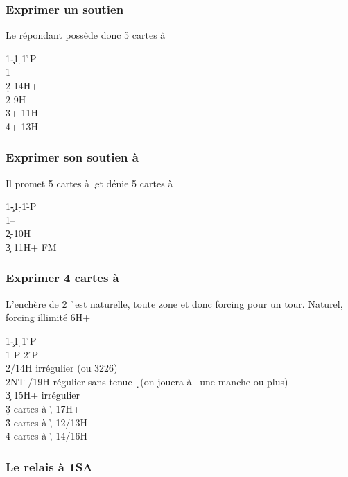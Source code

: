 \documentclass[a4paper]{article}
\begin{document}
\subsubsection{Exprimer un soutien \pdfs}

Le répondant possède donc 5 cartes à \s 

\begin{bidtable}
1\c-1\d-1\h-P\\
1\s--\\
2\d \> 14H+\\
2\s {}-9H\\
3\s {}+-11H\\
4\s {}+-13H
\end{bidtable}

\subsubsection{Exprimer son soutien à \pdfc}

Il promet 5 cartes à \c\ et dénie 5 cartes à \s 

\begin{bidtable}
1\c-1\d-1\h-P\\
1\s--\\
2\c {}-10H\\
3\c \> 11H+ FM
\end{bidtable}

\subsubsection{Exprimer 4 cartes à \pdfh}

L’enchère de 2 \h\ est naturelle, toute zone et donc forcing pour un tour.
Naturel, forcing illimité 6H+

\begin{bidtable}
1\c-1\d-1\h-P\\
1\s-P-2\h-P--\\
2\s {}/14H irrégulier (ou 3226)\\
2NT /19H régulier sans tenue \d\ (on jouera à \s\ une manche ou plus)\\
3\c \> 15H+ irrégulier\\
3\d {} cartes à \h , 17H+\\
3\h {} cartes à \h , 12/13H\\
4\h {} cartes à \h , 14/16H
\end{bidtable}

\subsubsection{Le relais à 1SA}
\end{document}
